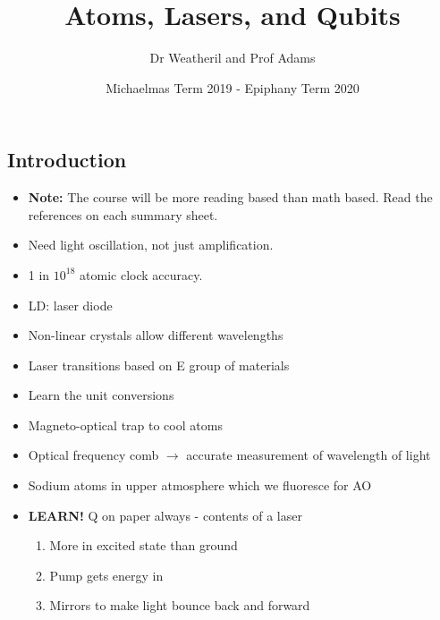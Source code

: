 \documentclass[a4paper, 11pt, normalem]{report}
\title{Atoms, Lasers, and Qubits \vspace{-20pt}}
\author{Dr Weatheril and Prof Adams}
\date{\vspace{-15pt}Michaelmas Term 2019 - Epiphany Term 2020}
\begin{document}
\maketitle

\part{}
\chapter{Introduction}
\begin{itemize}
    \item \textbf{Note:} The course will be more reading based than math based. 
Read the references on each summary sheet. 
    \item Need light oscillation, not just amplification.  
    \item 1 in $10^{18}$ atomic clock accuracy.
    \item LD: laser diode
    \item Non-linear crystals allow different wavelengths
    \item Laser transitions based on E group of materials
    \item Learn the unit conversions
    \item Magneto-optical trap to cool atoms
    \item Optical frequency comb $\to$ accurate measurement of wavelength of light 
    \item Sodium atoms in upper atmosphere which we fluoresce for AO
    \item \textbf{LEARN!} Q on paper always - contents of a laser
        \begin{enumerate}
            \item More in excited state than ground
            \item Pump gets energy in
            \item Mirrors to make light bounce back and forward
        \end{enumerate}
\end{itemize}
\end{document}
